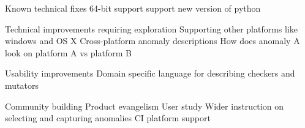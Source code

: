 Known technical fixes
64-bit support
support new version of python

Technical improvements requiring exploration
Supporting other platforms like windows and OS X
Cross-platform anomaly descriptions
  How does anomaly A look on platform A vs platform B

Usability improvements
  Domain specific language for describing checkers and mutators

Community building
  Product evangelism
  User study
  Wider instruction on selecting and capturing anomalies
  CI platform support
